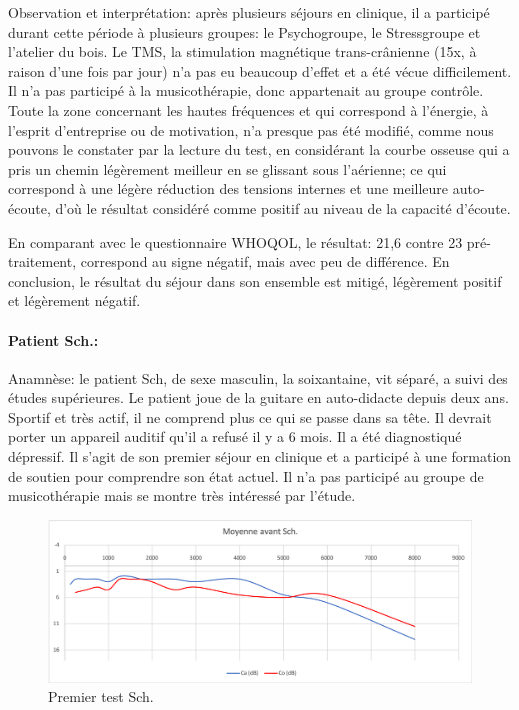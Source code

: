                 Observation et interprétation: après plusieurs séjours en clinique, il a participé durant cette 
                période à plusieurs groupes: le 
                Psychogroupe, le Stressgroupe et l'atelier du bois. Le TMS, la stimulation  magnétique 
                trans-crânienne 
                (15x, à raison 
                d'une fois par jour) n'a pas eu beaucoup d'effet et a été vécue difficilement.
                Il n'a pas participé à la musicothérapie, donc appartenait au groupe contrôle. 
                Toute la zone concernant les hautes fréquences et  qui 
                correspond à l'énergie, à 
                l'esprit d'entreprise ou de motivation, n'a presque pas été modifié, comme nous pouvons le 
                constater  
                par la lecture du test, en considérant la courbe osseuse qui a pris un chemin légèrement 
                meilleur en se glissant sous l'aérienne;  ce qui correspond à une légère réduction des tensions 
                internes et une meilleure auto-écoute, d'où le résultat considéré comme positif au niveau de la 
                capacité d'écoute.
                
                En comparant avec le questionnaire WHOQOL, le résultat: 21,6 contre 23 pré-traitement, 
                correspond au signe  négatif, mais avec peu de différence.
                En conclusion, le résultat du séjour dans son ensemble est mitigé, légèrement positif et 
                légèrement 
                négatif.

\paragraph{Patient Sch.:}
Anamnèse: le patient Sch, de sexe masculin, la soixantaine, vit séparé, a suivi des études supérieures. Le 
patient joue de la guitare en auto-didacte depuis deux ans. Sportif et très actif, il ne 
comprend plus ce qui se passe dans sa tête. Il devrait porter un appareil auditif qu'il a refusé il y a 6 mois. 
Il a été diagnostiqué dépressif. Il s'agit 
de son premier séjour en clinique et  a participé à une formation de soutien pour comprendre son état 
actuel. Il n'a pas participé au groupe de musicothérapie mais se montre très intéressé par l'étude.
\begin{figure}[th]
\centering
\includegraphics[width=0.7\linewidth]{images/graphiques/schaff_pre.png}
\caption[Patient Sch. : 1° test]{Premier test Sch.}

\end{figure}


